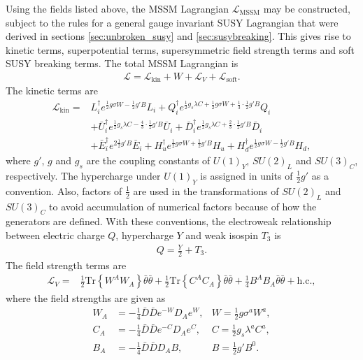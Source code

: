 \documentclass[twoside,english]{uiofysmaster}
\begin{document}
Using the fields listed above, the MSSM Lagrangian $\mathcal{L}_\mathrm{MSSM}$ may be constructed, subject to the rules for a general gauge invariant SUSY Lagrangian that were derived in sections \ref{sec:unbroken_susy} and \ref{sec:susybreaking}. This gives rise to kinetic terms, superpotential terms, supersymmetric field strength terms and soft SUSY breaking terms. The total MSSM Lagrangian is
\begin{align}
	\mathcal{L} = \mathcal{L}_\mathrm{kin} + W + \mathcal{L}_V + \mathcal{L}_\mathrm{soft}.
\end{align}
The kinetic terms are
\begin{align}
	\mathcal{L}_\mathrm{kin} = &L_i^\dag e^{\frac{1}{2}g\sigma W - \frac{1}{2}g'B} L_i + Q_i^\dag e^{\frac{1}{2}g_s \lambda C + \frac{1}{2}g\sigma W + \frac{1}{3}\cdot \frac{1}{2}g'B}Q_i\nonumber \\
	&+ \bar U_i^\dag e^{\frac{1}{2}g_s \lambda C - \frac{4}{3}\cdot \frac{1}{2}g'B}\bar U_i + \bar D_i^\dag e^{\frac{1}{2}g_s \lambda C + \frac{2}{3}\cdot \frac{1}{2}g'B}\bar D_i \\
	&+ \bar E_i^\dag e^{2\frac{1}{2}g'B}\bar E_i + H_u^\dag e^{\frac{1}{2}g\sigma W + \frac{1}{2} g' B} H_u + H_d^\dag e^{\frac{1}{2}g\sigma W - \frac{1}{2}g'B} H_d,\nonumber
\end{align}
where $g'$, $g$ and $g_s$ are the coupling constants of $U(1)_Y$, $SU(2)_L$ and $SU(3)_C$, respectively. The hypercharge under $U(1)_Y$ is assigned in units of $\frac{1}{2}g'$ as a convention. Also, factors of $\frac{1}{2}$ are used in the transformations of $SU(2)_L$ and $SU(3)_C$ to avoid accumulation of numerical factors because of how the generators are defined. With these conventions, the electroweak relationship between electric charge $Q$, hypercharge $Y$ and weak isospin $T_3$ is
\begin{align}
	Q = \frac{Y}{2} + T_3.
\end{align}
The field strength terms are 
\begin{align}
	\mathcal{L}_V = &\frac{1}{2}\mathrm{Tr} \left\{ W^A W_A \right\} \bar\theta\bar\theta + \frac{1}{2}\mathrm{Tr} \left\{ C^A C_A \right\} \bar\theta\bar\theta + \frac{1}{4}B^A B_A \bar\theta\bar\theta + \mathrm{h.c.},
\end{align}
where the field strengths are given as
\begin{align}
	W_A &= -\frac{1}{4}\bar D \bar D e^{-W} D_A e^W,  	&W = \frac{1}{2}g\sigma^a W^a,\\
	C_A &= -\frac{1}{4}\bar D \bar D e^{-C} D_A e^C,  	&C = \frac{1}{2}g_s \lambda^a C^a,\\
	B_A &= -\frac{1}{4}\bar D \bar D D_A B,  			&B = \frac{1}{2}g' B^0.
\end{align}
\end{document}
